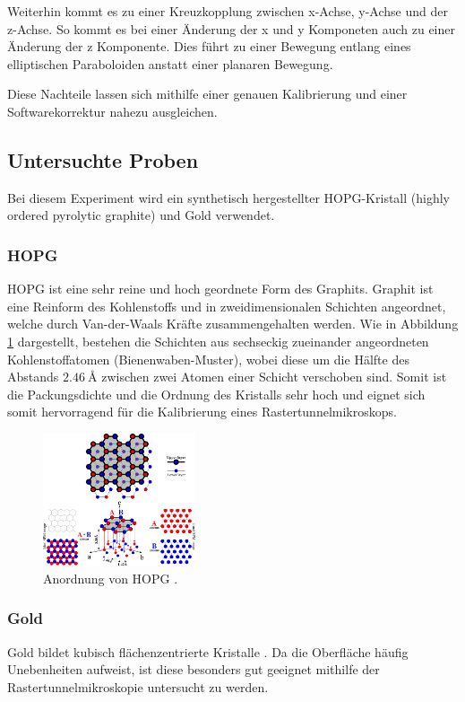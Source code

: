 Weiterhin kommt es zu einer Kreuzkopplung zwischen x-Achse, y-Achse und der z-Achse.
So kommt es bei einer Änderung der x und y Komponeten auch zu einer Änderung der z Komponente.
Dies führt zu einer Bewegung entlang eines elliptischen Paraboloiden anstatt einer planaren Bewegung.

Diese Nachteile lassen sich mithilfe einer genauen Kalibrierung und einer Softwarekorrektur nahezu ausgleichen.

\subsection{Untersuchte Proben} %
\label{sub:proben}

Bei diesem Experiment wird ein synthetisch hergestellter HOPG-Kristall (highly ordered pyrolytic graphite) und Gold verwendet.

\subsubsection{HOPG} %
\label{ssub:hopg}

HOPG ist eine sehr reine und hoch geordnete Form des Graphits.
Graphit ist eine Reinform des Kohlenstoffs und in zweidimensionalen Schichten angeordnet, welche durch Van-der-Waals Kräfte zusammengehalten werden.
Wie in Abbildung \ref{fig:hopg} dargestellt, bestehen die Schichten aus sechseckig zueinander angeordneten Kohlenstoffatomen (Bienenwaben-Muster), wobei diese um die Hälfte des Abstands $\SI{2,46}{\angstrom}$ zwischen zwei Atomen einer Schicht verschoben sind.
Somit ist die Packungsdichte und die Ordnung des Kristalls sehr hoch und eignet sich somit hervorragend für die Kalibrierung eines Rastertunnelmikroskops.
\begin{figure}[!h]
    \centering
    \includegraphics[width=0.4\textwidth]{images/hopg.jpg}
    \caption{Anordnung von HOPG \cite{STM-hopg}.}
    \label{fig:hopg}
\end{figure}

\subsubsection{Gold} %
\label{ssub:gold}

Gold bildet kubisch flächenzentrierte Kristalle \cite{STM-gold}.
Da die Oberfläche häufig Unebenheiten aufweist, ist diese besonders gut geeignet mithilfe der Rastertunnelmikroskopie untersucht zu werden.
